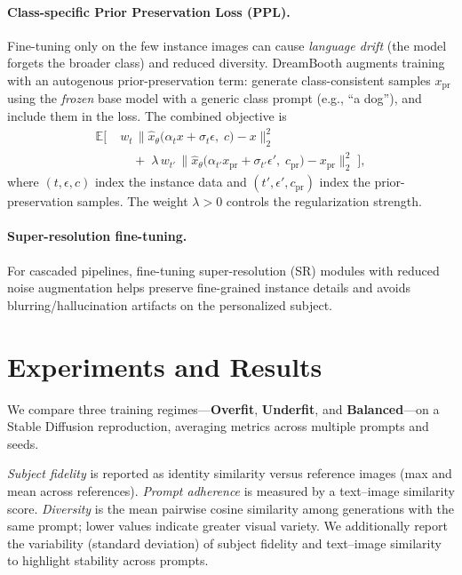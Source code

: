 \documentclass[11pt]{article}
\begin{document}
\paragraph{Class-specific Prior Preservation Loss (PPL).}
Fine-tuning only on the few instance images can cause \emph{language drift} (the model forgets the broader class) and reduced diversity. DreamBooth augments training with an autogenous prior-preservation term: generate class-consistent samples $x_{\mathrm{pr}}$ using the \emph{frozen} base model with a generic class prompt (e.g., ``a dog''), and include them in the loss. The combined objective is
\begin{equation}
\begin{aligned}
  \mathbb{E}\big[ \;
    & w_t\,\big\lVert \hat{x}_{\theta}\!\big(\alpha_t x + \sigma_t \epsilon,\; c\big) - x \big\rVert_2^2
    \\
    &\quad +\;\lambda\, w_{t'}\,\big\lVert \hat{x}_{\theta}\!\big(\alpha_{t'} x_{\mathrm{pr}} + \sigma_{t'} \epsilon',\; c_{\mathrm{pr}}\big) - x_{\mathrm{pr}} \big\rVert_2^2
  \; \big],
\end{aligned}
\label{eq:ppl}
\end{equation}
where $(t,\epsilon,c)$ index the instance data and $(t',\epsilon',c_{\mathrm{pr}})$ index the prior-preservation samples. The weight $\lambda > 0$ controls the regularization strength.

\paragraph{Super-resolution fine-tuning.}
For cascaded pipelines, fine-tuning super-resolution (SR) modules with reduced noise augmentation helps preserve fine-grained instance details and avoids blurring/hallucination artifacts on the personalized subject.

\section{Experiments and Results}
We compare three training regimes---\textbf{Overfit}, \textbf{Underfit}, and \textbf{Balanced}---on a Stable Diffusion reproduction, averaging metrics across multiple prompts and seeds.


\emph{Subject fidelity} is reported as identity similarity versus reference images (max and mean across references). \emph{Prompt adherence} is measured by a text--image similarity score. \emph{Diversity} is the mean pairwise cosine similarity among generations with the same prompt; lower values indicate greater visual variety. We additionally report the variability (standard deviation) of subject fidelity and text--image similarity to highlight stability across prompts.
\end{document}
